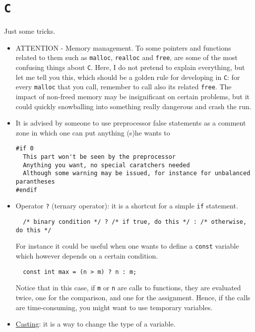 \documentclass[a4paper,12pt,%
              final%
              ]{article}
\begin{document}
\section{\texttt{C}}
\label{sec:c}
Just some tricks.
\begin{itemize}
  \item ATTENTION - Memory management. To some pointers and functions related to them such as \texttt{malloc}, \texttt{realloc} and \texttt{free}, are some of the most confusing things about \texttt{C}. Here, I do not pretend to explain everything, but let me tell you this, which should be a golden rule for developing in \texttt{C}: for every \texttt{malloc} that you call, remember to call also its related \texttt{free}. The impact of non-freed memory may be insignificant on certain problems, but it could quickly snowballing into something really dangerous and crash the run.
  \item It is advised by someone to use preprocessor false statements as a comment zone in which one can put anything (s)he wants to
\begin{verbatim}
#if 0
  This part won't be seen by the preprocessor
  Anything you want, no special caratchers needed
  Although some warning may be issued, for instance for unbalanced parantheses
#endif
\end{verbatim}
  \item Operator \verb|?| (ternary operator): it is a shortcut for a simple \texttt{if} statement.
\begin{verbatim}
  /* binary condition */ ? /* if true, do this */ : /* otherwise, do this */
\end{verbatim}
    For instance it could be useful when one wants to define a \texttt{const} variable which however depends on a certain condition.
\begin{verbatim}
  const int max = (n > m) ? n : m;
\end{verbatim}
    Notice that in this case, if \verb|m| or \verb|n| are calls to functions, they are evaluated twice, one for the comparison, and one for the assignment. Hence, if the calls are time-consuming, you might want to use temporary variables.
  \item \href{https://www.improgrammer.net/type-casting-c-language/}{Casting}: it is a way to change the type of a variable.
    \begin{itemize}

\end{itemize}
\end{itemize}
\end{document}
